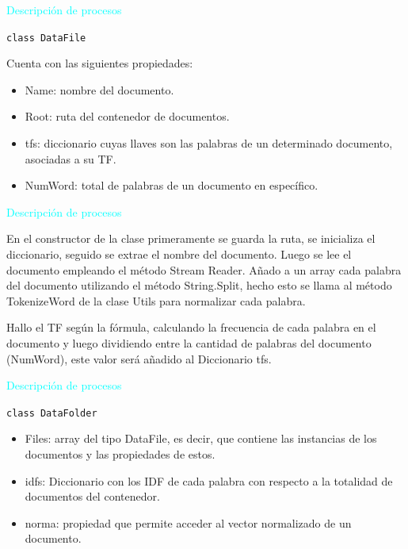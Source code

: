\documentclass[a4paper, 12pt]{beamer}
\begin{document}
\begin{frame}{\textcolor{cyan}{Descripción de procesos}}
    
    {\tt class DataFile}
    
    
    Cuenta con las siguientes propiedades:

    \begin{itemize}
        \item Name: nombre del documento.
        \item Root: ruta del contenedor de documentos.
        \item tfs: diccionario cuyas llaves son las palabras de un determinado documento, asociadas a su TF.
        \item NumWord: total de palabras de un documento en específico.
    \end{itemize}
\end{frame}

\begin{frame}{\textcolor{cyan}{Descripción de procesos}}
    
    {\small En el constructor de la clase primeramente se guarda la ruta, se inicializa el
    diccionario, seguido se extrae el nombre del documento. Luego se lee el
    documento empleando el método Stream Reader. Añado a un array cada palabra
    del documento utilizando el método String.Split, hecho esto se llama al método
    TokenizeWord de la clase Utils para normalizar cada palabra.}
    
    
    {\small Hallo el TF según la fórmula, calculando la frecuencia de
    cada palabra en el documento y luego dividiendo entre la cantidad de palabras del
    documento (NumWord), este valor será añadido al Diccionario tfs.}
\end{frame}

\begin{frame}{\textcolor{cyan}{Descripción de procesos}}
    
    {\tt class DataFolder}
    \begin{itemize}
        \item Files: array del tipo DataFile, es decir, que contiene las instancias de los documentos y las propiedades de estos.
        \item idfs: Diccionario con los IDF de cada palabra con respecto a la totalidad de documentos del contenedor.
        \item norma: propiedad que permite acceder al vector normalizado de un documento.
    \end{itemize}

\end{frame}
\end{document}
